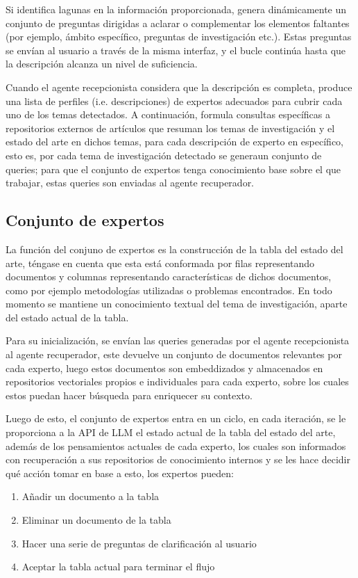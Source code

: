 \documentclass[12pt]{article}
\begin{document}
Si identifica lagunas en la información proporcionada, genera dinámicamente un conjunto de preguntas dirigidas a aclarar o complementar los elementos faltantes (por ejemplo, ámbito específico, preguntas de investigación etc.). Estas preguntas se envían al usuario a través de la misma interfaz, y el bucle continúa hasta que la descripción alcanza un nivel de suficiencia.

Cuando el agente recepcionista considera que la descripción es completa, produce una lista de perfiles (i.e. descripciones) de expertos adecuados para cubrir cada uno de los temas detectados. A continuación, formula consultas específicas a repositorios externos de artículos que resuman los temas de investigación y el estado del arte en dichos temas, para cada descripción de experto en específico, esto es, por cada tema de investigación detectado se generaun conjunto de queries; para que el conjunto de expertos tenga conocimiento base sobre el que trabajar, estas queries son enviadas al agente recuperador.

\subsection{Conjunto de expertos}
La función del conjuno de expertos es la construcción de la tabla del estado del arte, téngase en cuenta que esta está conformada por filas representando documentos y columnas representando características de dichos documentos, como por ejemplo metodologías utilizadas o problemas encontrados. En todo momento se mantiene un conocimiento textual del tema de investigación, aparte del estado actual de la tabla.

Para su inicialización, se envían las queries generadas por el agente recepcionista al agente recuperador, este devuelve un conjunto de documentos relevantes por cada experto, luego estos documentos son embeddizados y almacenados en repositorios vectoriales propios e individuales para cada experto, sobre los cuales estos puedan hacer búsqueda para enriquecer su contexto. 

Luego de esto, el conjunto de expertos entra en un ciclo, en cada iteración, se le proporciona a la API de LLM el estado actual de la tabla del estado del arte, además de los pensamientos actuales de cada experto, los cuales son informados con recuperación a sus repositorios de conocimiento internos y se les hace decidir qué acción tomar en base a esto, los expertos pueden:

\begin{enumerate}
	\item Añadir un documento a la tabla
	\item Eliminar un documento de la tabla
	\item Hacer una serie de preguntas de clarificación al usuario
	\item Aceptar la tabla actual para terminar el flujo
\end{enumerate}
\end{document}
